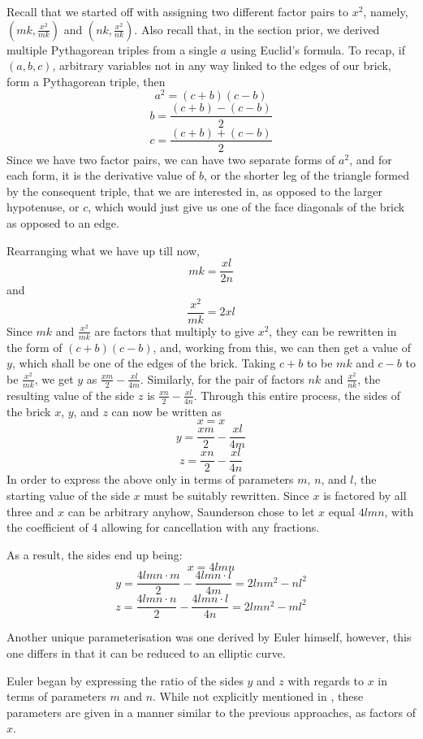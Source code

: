 \documentclass[11pt]{article}
\begin{document}
Recall that we started off with assigning two different factor pairs to $x^2$, namely, $(mk, \frac{x^2}{mk})$ and $(nk, \frac{x^2}{nk})$. Also recall that, in the section prior, we derived multiple Pythagorean triples from a single $a$ using Euclid's formula. To recap, if $(a, b, c)$, arbitrary variables not in any way linked to the edges of our brick, form a Pythagorean triple,
then 
$$a^2=(c+b)(c-b)$$
$$b=\frac{(c+b)-(c-b)}{2}$$
$$c=\frac{(c+b)+(c-b)}{2}$$
Since we have two factor pairs, we can have two separate forms of $a^2$, and for each form, it is the derivative value of $b$, or the shorter leg of the triangle formed by the consequent triple, that we are interested in, as opposed to the larger hypotenuse, or $c$, which would just give us one of the face diagonals of the brick as opposed to an edge.

Rearranging what we have up till now,
$$mk=\frac{xl}{2n}$$
and 
$$\frac{x^2}{mk}=2xl$$
Since $mk$ and $\frac{x^2}{mk}$ are factors that multiply to give $x^2$, they can be rewritten in the form of $(c+b)(c-b)$, and, working from this, we can then get a value of $y$, which shall be one of the edges of the brick. Taking $c+b$ to be $mk$ and $c-b$ to be $\frac{x^2}{mk}$, we get $y$ as $\frac{xm}{2}-\frac{xl}{4m}$. Similarly, for the pair of factors $nk$ and $\frac{x^2}{nk}$, the resulting value of the side $z$ is $\frac{xn}{2}-\frac{xl}{4n}$.
Through this entire process, the sides of the brick $x$, $y$, and $z$ can now be written as
$$x=x$$
$$y=\frac{xm}{2}-\frac{xl}{4m}$$
$$z=\frac{xn}{2}-\frac{xl}{4n}$$
In order to express the above only in terms of parameters $m$, $n$, and $l$, the starting value of the side $x$ must be suitably rewritten. Since $x$ is factored by all three and $x$ can be arbitrary anyhow, Saunderson chose to let $x$ equal $4lmn$, with the coefficient of 4 allowing for cancellation with any fractions.

As a result, the sides end up being:
$$x=4lmn$$
$$y=\frac{4lmn\cdot{m}}{2}-\frac{4lmn\cdot{l}}{4m}=2lnm^2-nl^2$$
$$z=\frac{4lmn\cdot{n}}{2}-\frac{4lmn\cdot{l}}{4n}=2lmn^2-ml^2$$

Another unique parameterisation was one derived by Euler himself, however, this one differs in that it can be reduced to an elliptic curve.

Euler began by expressing the ratio of the sides $y$ and $z$ with regards to $x$ in terms of parameters $m$ and $n$. While not explicitly mentioned in \cite{euler}, these parameters are given in a manner similar to the previous approaches, as factors of $x$.
\end{document}
